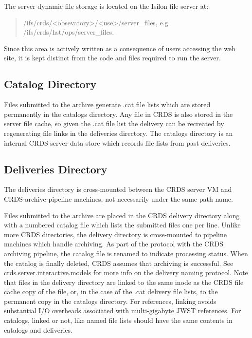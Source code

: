 \documentclass[letterpaper,10pt,english]{sphinxmanual}
\begin{document}
The server dynamic file storage is located on the Isilon file server at:
\begin{quote}

/ifs/crds/\textless{}obsevatory\textgreater{}/\textless{}use\textgreater{}/server\_files,    e.g. /ifs/crds/hst/ops/server\_files.
\end{quote}

Since this area is actively written as a consequence of users accessing the web site,  it is kept distinct from the
code and files required to run the server.


\subsection{Catalog Directory}
\label{server_guide:catalog-directory}
Files submitted to the archive generate .cat file lists which are stored permanently in the catalogs directory.
Any file in CRDS is also stored in the server file cache,  so given the .cat file list the delivery can be recreated
by regenerating file links in the deliveries directory.  The catalogs directory is an internal CRDS server data store
which records file lists from past deliveries.


\subsection{Deliveries Directory}
\label{server_guide:deliveries-directory}
The deliveries directory is cross-mounted between the CRDS server VM and CRDS-archive-pipeline machines,  not
necessarily under the same path name.

Files submitted to the archive are placed in the CRDS delivery directory along with a numbered catalog file which
lists the submitted files one per line.   Unlike more CRDS directories,  the delivery directory is cross-mounted
to pipeline machines which handle archiving.  As part of the protocol with the CRDS archiving pipeline,  the catalog
file is renamed to indicate processing status.  When the catalog is finally deleted,  CRDS assumes that archiving
is successful.   See crds.server.interactive.models for more info on the delivery naming protocol.  Note that files
in the delivery directory are linked to the same inode as the CRDS file cache copy of the file,  or,  in the case
of the .cat delivery file lists, to the permanent copy in the catalogs directory.  For references,  linking avoids
substantial I/O overheads associated with multi-gigabyte JWST references.  For catalogs,  linked or not,  like named
file lists should have the same contents in catalogs and deliveries.
\end{document}
